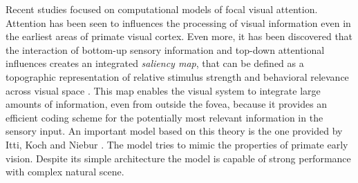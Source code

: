 Recent studies focused on computational models of focal visual attention. Attention has been seen to influences the processing of visual information even in the earliest areas of primate visual cortex. Even more, it has been discovered that the interaction of bottom-up sensory information and top-down attentional influences creates an integrated \textit{saliency map}, that can be defined as a topographic representation of relative stimulus strength and behavioral relevance across visual space \cite{Saliency_WWHW}. This map enables the visual system to integrate large amounts of information, even from outside the fovea, because it provides an efficient coding scheme for the potentially most relevant information in the sensory input.
An important model based on this theory is the one provided by Itti, Koch and Niebur \cite{Itti_review}\cite{Itti_model}. The model tries to mimic the properties of primate early vision. Despite its simple architecture the model is capable of strong performance with complex natural scene.
